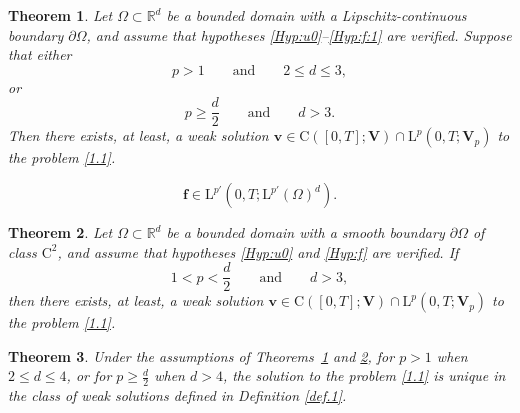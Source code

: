 \documentclass[10pt,a4paper]{amsart}
\newtheorem{theorem}{Theorem}[section]
\theoremstyle{definition}
\def\1{\Omega}
\def\R{\mathbb{R}}
\def\L{\mathrm{L}}
\def\vv{\boldsymbol{v}}
\def\f{\boldsymbol{f}}
\def\C{\mathrm{C}}
\def\bfV{\mathbf{V}}
\begin{document}
\setcounter{section}{3}
\setcounter{equation}{4}
\setcounter{claim}{0}
\setcounter{condition}{0}
\setcounter{conjecture}{0}
\setcounter{criterion}{0}
\setcounter{exercise}{0}
\setcounter{notation}{0}
\setcounter{problem}{0}
\setcounter{solution}{0}
\setcounter{theorem}{1}
\begin{theorem}\label{thm:exist:1}
Let $\1\subset\R^d$ be a bounded domain with a \emph{Lipschitz-continuous boundary $\partial\1$}, and assume that hypotheses \eqref{Hyp:u0}--\eqref{Hyp:f:1} are verified.
Suppose that either
\begin{equation}\label{cond:1:thm1}
p>1\qquad \mbox{and}\qquad 2\leq d\leq 3,
\end{equation}
or
{
\begin{equation}\label{cond:2:thm1}
p\geq \frac{d}{2}\qquad \mbox{and}\qquad d>3.
\end{equation}
}
Then there exists, at least, a weak solution $\vv \in \C([0,T];\bfV)\cap \L^p(0,T;\bfV_p)$ to the problem \eqref{1.1}.
	\end{theorem}

\setcounter{section}{3}
\setcounter{equation}{6}
\setcounter{claim}{0}
\setcounter{condition}{0}
\setcounter{conjecture}{0}
\setcounter{criterion}{0}
\setcounter{exercise}{0}
\setcounter{notation}{0}
\setcounter{problem}{0}
\setcounter{solution}{0}
\setcounter{theorem}{2}
\begin{equation}\label{Hyp:f}
  \f\in\L^{p'}(0,T;\L^{p'}(\1)^d).
\end{equation}

\setcounter{section}{3}
\setcounter{equation}{7}
\setcounter{claim}{0}
\setcounter{condition}{0}
\setcounter{conjecture}{0}
\setcounter{criterion}{0}
\setcounter{exercise}{0}
\setcounter{notation}{0}
\setcounter{problem}{0}
\setcounter{solution}{0}
\setcounter{theorem}{2}
\begin{theorem}\label{thm:exist:2}
Let $\1\subset\R^d$ be a bounded domain with a \emph{smooth boundary $\partial\1$ of class $\C^2$}, and assume that hypotheses \eqref{Hyp:u0} and \eqref{Hyp:f} are verified.
If
{\begin{equation}\label{3.7}
1<p<\frac{d}{2}\qquad \mbox{and}\qquad d>3,
\end{equation}
}then there exists, at least, a weak solution $\vv \in \C([0,T];\bfV)\cap \L^p(0,T;\bfV_p)$ to the problem \eqref{1.1}.
	\end{theorem}

\setcounter{section}{3}
\setcounter{equation}{8}
\setcounter{claim}{0}
\setcounter{condition}{0}
\setcounter{conjecture}{0}
\setcounter{criterion}{0}
\setcounter{exercise}{0}
\setcounter{notation}{0}
\setcounter{problem}{0}
\setcounter{solution}{0}
\setcounter{theorem}{3}
\begin{theorem}\label{UniT}
{	Under the assumptions of Theorems~\ref{thm:exist:1} and \ref{thm:exist:2}, for $p>1$ when $2\leq d\leq 4$, or for $p\geq \frac{d}{2}$ when $d>4$, the solution to the problem \eqref{1.1} is {unique in the class of weak solutions defined in Definition \ref{def.1}}.}
\end{theorem}
\end{document}
